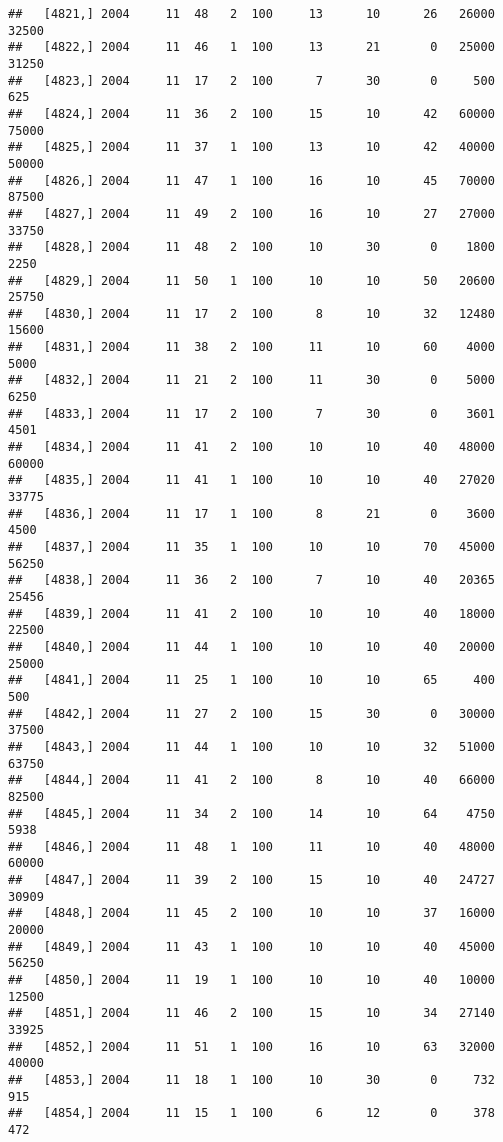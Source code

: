 \documentclass{article}\usepackage[]{graphicx}\usepackage[]{color}
\makeatletter
\newenvironment{kframe}{%
 \def\at@end@of@kframe{}%
 \ifinner\ifhmode%
  \def\at@end@of@kframe{\end{minipage}}%
  \begin{minipage}{\columnwidth}%
 \fi\fi%
 \def\FrameCommand##1{\hskip\@totalleftmargin \hskip-\fboxsep
 \colorbox{shadecolor}{##1}\hskip-\fboxsep
     \hskip-\linewidth \hskip-\@totalleftmargin \hskip\columnwidth}%
 \MakeFramed {\advance\hsize-\width
   \@totalleftmargin\z@ \linewidth\hsize
   \@setminipage}}%
 {\par\unskip\endMakeFramed%
 \at@end@of@kframe}
\newenvironment{knitrout}{}{} %
\makeatother
\begin{document}
\begin{knitrout}
\begin{kframe}
\begin{verbatim}
##   [4821,] 2004     11  48   2  100     13      10      26   26000   32500
##   [4822,] 2004     11  46   1  100     13      21       0   25000   31250
##   [4823,] 2004     11  17   2  100      7      30       0     500     625
##   [4824,] 2004     11  36   2  100     15      10      42   60000   75000
##   [4825,] 2004     11  37   1  100     13      10      42   40000   50000
##   [4826,] 2004     11  47   1  100     16      10      45   70000   87500
##   [4827,] 2004     11  49   2  100     16      10      27   27000   33750
##   [4828,] 2004     11  48   2  100     10      30       0    1800    2250
##   [4829,] 2004     11  50   1  100     10      10      50   20600   25750
##   [4830,] 2004     11  17   2  100      8      10      32   12480   15600
##   [4831,] 2004     11  38   2  100     11      10      60    4000    5000
##   [4832,] 2004     11  21   2  100     11      30       0    5000    6250
##   [4833,] 2004     11  17   2  100      7      30       0    3601    4501
##   [4834,] 2004     11  41   2  100     10      10      40   48000   60000
##   [4835,] 2004     11  41   1  100     10      10      40   27020   33775
##   [4836,] 2004     11  17   1  100      8      21       0    3600    4500
##   [4837,] 2004     11  35   1  100     10      10      70   45000   56250
##   [4838,] 2004     11  36   2  100      7      10      40   20365   25456
##   [4839,] 2004     11  41   2  100     10      10      40   18000   22500
##   [4840,] 2004     11  44   1  100     10      10      40   20000   25000
##   [4841,] 2004     11  25   1  100     10      10      65     400     500
##   [4842,] 2004     11  27   2  100     15      30       0   30000   37500
##   [4843,] 2004     11  44   1  100     10      10      32   51000   63750
##   [4844,] 2004     11  41   2  100      8      10      40   66000   82500
##   [4845,] 2004     11  34   2  100     14      10      64    4750    5938
##   [4846,] 2004     11  48   1  100     11      10      40   48000   60000
##   [4847,] 2004     11  39   2  100     15      10      40   24727   30909
##   [4848,] 2004     11  45   2  100     10      10      37   16000   20000
##   [4849,] 2004     11  43   1  100     10      10      40   45000   56250
##   [4850,] 2004     11  19   1  100     10      10      40   10000   12500
##   [4851,] 2004     11  46   2  100     15      10      34   27140   33925
##   [4852,] 2004     11  51   1  100     16      10      63   32000   40000
##   [4853,] 2004     11  18   1  100     10      30       0     732     915
##   [4854,] 2004     11  15   1  100      6      12       0     378     472

\end{verbatim}
\end{kframe}
\end{knitrout}
\end{document}
